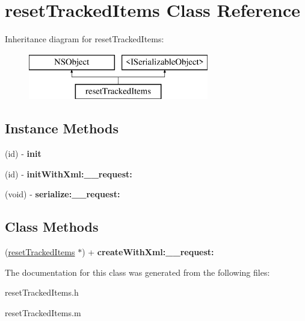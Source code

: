 \hypertarget{interfacereset_tracked_items}{}\section{reset\+Tracked\+Items Class Reference}
\label{interfacereset_tracked_items}
Inheritance diagram for reset\+Tracked\+Items\+:\begin{figure}[H]
\begin{center}
\leavevmode
\includegraphics[height=2.000000cm]{interfacereset_tracked_items}
\end{center}
\end{figure}
\subsection*{Instance Methods}
\begin{DoxyCompactItemize}
\item 
\hypertarget{interfacereset_tracked_items_a6ef9eaf7488688f0cd617c236e92d318}{}(id) -\/ {\bfseries init}\label{interfacereset_tracked_items_a6ef9eaf7488688f0cd617c236e92d318}

\item 
\hypertarget{interfacereset_tracked_items_ac4403c89f89c46eb7de181a41c75f6cc}{}(id) -\/ {\bfseries init\+With\+Xml\+:\+\_\+\+\_\+request\+:}\label{interfacereset_tracked_items_ac4403c89f89c46eb7de181a41c75f6cc}

\item 
\hypertarget{interfacereset_tracked_items_a7278c5b43a77d6f39bc33575e86bd8eb}{}(void) -\/ {\bfseries serialize\+:\+\_\+\+\_\+request\+:}\label{interfacereset_tracked_items_a7278c5b43a77d6f39bc33575e86bd8eb}

\end{DoxyCompactItemize}
\subsection*{Class Methods}
\begin{DoxyCompactItemize}
\item 
\hypertarget{interfacereset_tracked_items_ac04ac640f593f7035e4559f7e0f7f65c}{}(\hyperlink{interfacereset_tracked_items}{reset\+Tracked\+Items} $\ast$) + {\bfseries create\+With\+Xml\+:\+\_\+\+\_\+request\+:}\label{interfacereset_tracked_items_ac04ac640f593f7035e4559f7e0f7f65c}

\end{DoxyCompactItemize}


The documentation for this class was generated from the following files\+:\begin{DoxyCompactItemize}
\item 
reset\+Tracked\+Items.\+h\item 
reset\+Tracked\+Items.\+m\end{DoxyCompactItemize}

